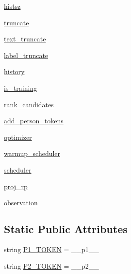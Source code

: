 \begin{DoxyCompactItemize}
\hyperlink{classparlai_1_1core_1_1torch__agent_1_1TorchAgent_a15cbb1f743c1d341d914ade47e49071b}{histsz}
\item 
\hyperlink{classparlai_1_1core_1_1torch__agent_1_1TorchAgent_a3ae27e9fe68d255a960bcb5180f48a65}{truncate}
\item 
\hyperlink{classparlai_1_1core_1_1torch__agent_1_1TorchAgent_ae3a69ecb5f20ce4f8a09c05c5f6f4376}{text\+\_\+truncate}
\item 
\hyperlink{classparlai_1_1core_1_1torch__agent_1_1TorchAgent_adbdd7cf2deb2c43d982c57852b83e685}{label\+\_\+truncate}
\item 
\hyperlink{classparlai_1_1core_1_1torch__agent_1_1TorchAgent_a0484b0246f0a930adc575899cdef033c}{history}
\item 
\hyperlink{classparlai_1_1core_1_1torch__agent_1_1TorchAgent_ab0bd6456c94dfd9afae73b86f05016cf}{is\+\_\+training}
\item 
\hyperlink{classparlai_1_1core_1_1torch__agent_1_1TorchAgent_a6355b9b0c0ccb24ffe1b5e3d89903cc3}{rank\+\_\+candidates}
\item 
\hyperlink{classparlai_1_1core_1_1torch__agent_1_1TorchAgent_a63011fa9bd927de8acc9ffa676caa73a}{add\+\_\+person\+\_\+tokens}
\item 
\hyperlink{classparlai_1_1core_1_1torch__agent_1_1TorchAgent_a9533344de40049bf13209739bc92199d}{optimizer}
\item 
\hyperlink{classparlai_1_1core_1_1torch__agent_1_1TorchAgent_a54d8632c546ab621c93c34f13c964726}{warmup\+\_\+scheduler}
\item 
\hyperlink{classparlai_1_1core_1_1torch__agent_1_1TorchAgent_a0affe6b199275c182a27c9aa07393347}{scheduler}
\item 
\hyperlink{classparlai_1_1core_1_1torch__agent_1_1TorchAgent_a805a9e47552d54d56f5b232ab4d5121f}{proj\+\_\+rp}
\item 
\hyperlink{classparlai_1_1core_1_1torch__agent_1_1TorchAgent_a4bc525b20568822a042b3bbfa3da3a69}{observation}
\end{DoxyCompactItemize}
\subsection*{Static Public Attributes}
\begin{DoxyCompactItemize}
\item 
string \hyperlink{classparlai_1_1core_1_1torch__agent_1_1TorchAgent_ac946030b54cc854162e8bc6b7aad7272}{P1\+\_\+\+T\+O\+K\+EN} = \textquotesingle{}\+\_\+\+\_\+p1\+\_\+\+\_\+\textquotesingle{}
\item 
string \hyperlink{classparlai_1_1core_1_1torch__agent_1_1TorchAgent_af6e16e0532e71b06328e078cb3c9324c}{P2\+\_\+\+T\+O\+K\+EN} = \textquotesingle{}\+\_\+\+\_\+p2\+\_\+\+\_\+\textquotesingle{}
\end{DoxyCompactItemize}


